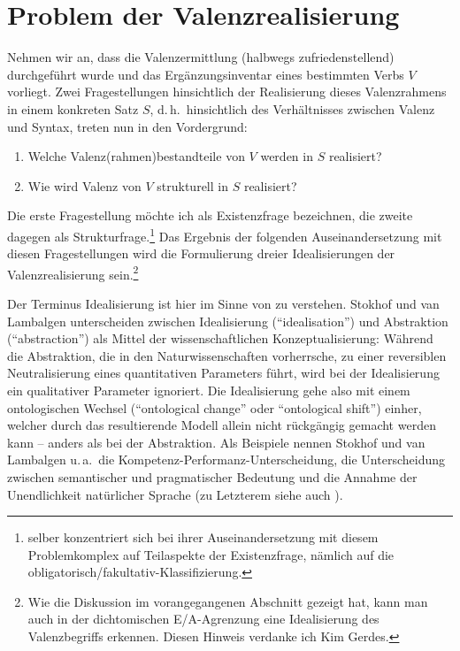 \section{Problem der Valenzrealisierung} \label{sec-valenzrealisierung}

Nehmen wir an, dass die Valenzermittlung (halbwegs zufriedenstellend) durchgeführt wurde und das Ergänzungsinventar eines bestimmten Verbs $V$ vorliegt. Zwei Fragestellungen hinsichtlich der Realisierung dieses Valenzrahmens in einem konkreten Satz $S$, d.\,h.\ hinsichtlich des Verhältnisses zwischen Valenz und Syntax, treten nun in den Vordergrund: 
\begin{enumerate}
  \item Welche Valenz(rahmen)bestandteile von $V$ werden in $S$ realisiert?
  \item Wie wird Valenz von $V$ strukturell in $S$ realisiert?
\end{enumerate}
Die erste Fragestellung möchte ich als Existenzfrage bezeichnen, die zweite dagegen als Strukturfrage.\footnote{\cite{Storrer:92} selber konzentriert sich bei ihrer Auseinandersetzung mit diesem Problemkomplex auf Teilaspekte der Existenzfrage, nämlich auf die obligatorisch/fakultativ-Klassifizierung.} Das Ergebnis der folgenden Auseinandersetzung mit diesen Fragestellungen wird die Formulierung dreier Idealisierungen der Valenzrealisierung sein.\footnote{Wie die Diskussion im vorangegangenen Abschnitt gezeigt hat, kann man auch in der  dichtomischen E/A-Agrenzung eine Idealisierung des Valenzbegriffs erkennen. Diesen Hinweis verdanke ich Kim Gerdes.}

Der Terminus Idealisierung ist hier im Sinne von \cite{Stokhof:Lambalgen:11} zu verstehen. Stokhof und van Lambalgen unterscheiden zwischen Idealisierung ("`idealisation"') und Abstraktion ("`abstraction"') als Mittel der wissenschaftlichen Konzeptualisierung: Während die Abstraktion, die in den Naturwissenschaften vorherrsche, zu einer reversiblen Neutralisierung eines quantitativen Parameters führt, wird bei der Idealisierung ein qualitativer Parameter ignoriert. Die Idealisierung gehe also mit einem ontologischen Wechsel ("`ontological change"' oder "`ontological shift"') einher, welcher durch das resultierende Modell allein nicht rückgängig gemacht werden kann -- anders als bei der Abstraktion. Als Beispiele nennen Stokhof und van Lambalgen u.\,a.\ die Kompetenz-Performanz-Unterscheidung, die Unterscheidung zwischen semantischer und pragmatischer Bedeutung und die Annahme der Unendlichkeit natürlicher Sprache (zu Letzterem siehe auch \citealt{Pullum:Scholz:10}). 

